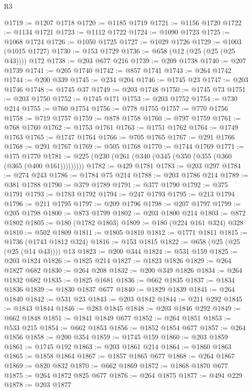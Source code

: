 \begin{lexlean}{R3}
\begin{coremodule}
@1719 := @1207 @1718
@1720 := @1185 @1719
@1721 := @1156 @1720
@1722 := @1134 @1721
@1723 := @1112 @1722
@1724 := @1090 @1723
@1725 := @1068 @1724
@1726 := @1050 @1725
@1727 := @1029 @1726
@1729 := @1003 (@1015 @1727)
@1730 := @153 @1729
@1736 := @658 (@12 (@25 (@25 (@25 @43)))) @172
@1738 := @203 @677 @216
@1739 := @209 @1738
@1740 := @207 @1739
@1741 := @205 @1740
@1742 := @857 @1741
@1743 := @264 @1742
@1744 := @200 @339
@1745 := @234 @204
@1746 := @1745 @23
@1747 := @203 @1746
@1748 := @1745 @37
@1749 := @203 @1748
@1750 := @1745 @73
@1751 := @203 @1750
@1752 := @1745 @171
@1753 := @203 @1752
@1754 := @730 @214
@1755 := @760 @1754
@1756 := @778 @1755
@1757 := @770 @1756
@1758 := @719 @1757
@1759 := @878 @1758
@1760 := @797 @1759
@1761 := @768 @1760
@1762 := @1753 @1761
@1763 := @1751 @1762
@1764 := @1749 @1763
@1765 := @1747 @1764
@1766 := @705 @1765
@1767 := @291 @1766
@1768 := @291 @1767
@1769 := @505 @1768
@1770 := @1744 @1769
@1771 := @175 @1770
@1781 := @225 (@230 (@261 (@340 (@345 (@350 (@355 (@360 (@365 (@400 @161)))))))))
@1782 := @429 @1781
@1783 := @203 @297
@1784 := @274 @243
@1786 := @1784 @75 @214
@1788 := @203 @1786 @214
@1789 := @381 @1788
@1790 := @379 @1789
@1791 := @377 @1790
@1792 := @375 @1791
@1793 := @1783 @1792
@1794 := @247 @1793
@1795 := @213 @1794
@1796 := @211 @1795
@1797 := @209 @1796
@1798 := @207 @1797
@1799 := @205 @1798
@1800 := @873 @1799
@1802 := @203 @1800 @214
@1803 := @872 @1802
@1805 := @180 (@1782 @1803)
@1809 := @180 (@224 @161 @324) @328
@1810 := @502 @1809
@1811 := @1805 @1810
@1812 := @1771 @1811
@1815 := @1736 (@1743 @1812 @324)
@1816 := @153 @1815
@1822 := @658 (@25 (@25 (@25 (@14 @43)))) @13
@1823 := @200 @344
@1824 := @531 @159
@1825 := @203 @1824
@1826 := @1825 @214
@1827 := @1823 @1826
@1829 := @264 @1827 @682
@1830 := @264 @208
@1832 := @200 @349 @1826
@1834 := @264 @1832 @682
@1835 := @1825 @1681
@1836 := @662 @1835
@1837 := @1834 @1836
@1839 := @1830 @1837 @677
@1840 := @1829 @1839
@1841 := @264 @1840
@1842 := @531 @23
@1843 := @203 @1842
@1844 := @211 @292
@1845 := @1843 @1844
@1846 := @283 @1845
@1848 := @203 @1846 @292
@1849 := @662 @1848
@1851 := @1841 @1849 @677
@1852 := @264 @1851
@1853 := @533 @215
@1854 := @662 @1853
@1856 := @1852 @1854 @677
@1857 := @264 @1856
@1858 := @200 @354
@1859 := @1745 @159
@1860 := @203 @1859
@1861 := @1745 @192
@1863 := @203 @1861 @214
@1864 := @1860 @1863
@1865 := @1858 @1864
@1867 := @1857 @1865 @677
@1868 := @264 @1867
@1869 := @820 @832
@1870 := @662 @1869
@1872 := @1868 @1870 @677
@1875 := @264 @1872 @825 @677
@1876 := @264 @1875
@1877 := @494 @229
@1878 := @203 @1877

\end{coremodule}
\end{lexlean}
